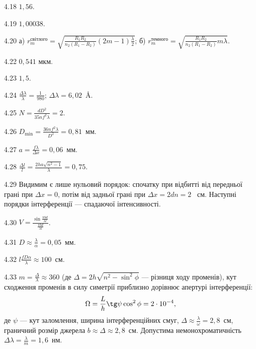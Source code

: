 \begin{Solution}{4.{18}}
	$ 1,56 $.
\end{Solution}
\begin{Solution}{4.{19}}
	$ 1,00038 $.
\end{Solution}
\begin{Solution}{4.{20}}
	а) $r_m^{\text{світлого}} = \sqrt{\frac{R_1R_2}{n_2(R_1 - R_2)} (2m-1)\frac\lambda2 }$; б)   $r_m^{\text{темного}} = \sqrt{\frac{R_1R_2}{n_2(R_1 - R_2)} m\lambda}$.
\end{Solution}
\begin{Solution}{4.{22}}
	$ 0,541 $ мкм.
\end{Solution}
\begin{Solution}{4.{23}}
	$ 1,5 $.
\end{Solution}
\begin{Solution}{4.{24}}
	$\frac{\Delta\lambda}{\lambda} = \frac1{980}$; $\Delta\lambda = 6,02$~\AA.
\end{Solution}
\begin{Solution}{4.{25}}
	$N = \frac{dD^2}{35nf^2\lambda} = 2$.
\end{Solution}
\begin{Solution}{4.{26}}
	$D_{\min} = \frac{36nf^2\lambda}{D^2} = 0,81$~мм.
\end{Solution}
\begin{Solution}{4.{27}}
	$a = \frac{f\lambda}{ \Delta x} = 0,06$~мм.
\end{Solution}
\begin{Solution}{4.{28}}
	$ \frac{\Delta l}{l}  = \frac{2ha\sqrt{n^2 - 1}}{\lambda} = 0,75$.
\end{Solution}
\begin{Solution}{4.{29}}
	Видимим є лише нульовий порядок: спочатку при відбитті від передньої грані
	при $ \Delta x = 0 $, потім від задньої грані при $ \Delta  x = 2dn = 2 $~ см. Наступні порядки
	інтерференції --- спадаючої інтенсивності.
\end{Solution}
\begin{Solution}{4.{30}}
	$V = \frac{\sin\frac{\pi b d}{\lambda l}}{\frac{\pi b d}{\lambda l}}$.
\end{Solution}
\begin{Solution}{4.{31}}
	$D \approx \frac{\lambda}{\alpha} = 0,05$~мм.
\end{Solution}
\begin{Solution}{4.{32}}
	$ l \frac{fD\alpha}{\lambda} \approx 100$~см.
\end{Solution}
\begin{Solution}{4.{33}}
	$m = \frac{\Delta}{\lambda} \approx 360$ (де $\Delta = 2h\sqrt{n^2 - \sin^2\phi}$ --- різниця ходу променів), кут сходження променів в силу симетрії приблизно дорівнює апертурі інтерференції:
	\begin{equation*}
		\Omega = \frac{L}{h} \tg\psi\cos^2\phi = 2\cdot10^{-4},
	\end{equation*}
	де $\psi$ --- кут заломлення, ширина інтерференційних смуг, $\Delta \approx \frac{\lambda}{\omega} = 2,8$~см, граничний розмір джерела $b \approx \Delta \approx 2,8$~см. Допустима немонохроматичність
	$ \Delta\lambda =  \frac{\lambda}{m} = 1,6 $~нм.
\end{Solution}
